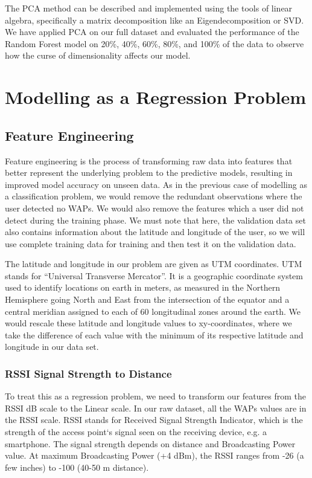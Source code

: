 \documentclass[a4paper,singleside,12pt]{report} %
\begin{document}
				The PCA method can be described and implemented using the tools of linear algebra, specifically a matrix decomposition like an Eigendecomposition or SVD. 
				We have applied PCA on our full dataset and evaluated the performance of the Random Forest model on 20\%, 40\%, 60\%, 80\%, and 100\% of the data to observe how the curse of dimensionality affects our model.



\newpage


		\section{Modelling as a Regression Problem}
			\subsection{Feature Engineering}

			Feature engineering is the process of transforming raw data into features that better represent the underlying problem to the predictive models, resulting in improved model accuracy on unseen data. 
			As in the previous case of modelling as a classification problem, we would remove the redundant observations where the user detected no WAPs. 
			We would also remove the features which a user did not detect during the training phase. 
			We must note that here, the validation data set also contains information about the latitude and longitude of the user, so we will use complete training data for training and then test it on the validation data.
			
			The latitude and longitude in our problem are given as UTM coordinates. 
			UTM stands for “Universal Transverse Mercator”. 
			It is a geographic coordinate system used to identify locations on earth in meters, as measured in the Northern Hemisphere going North and East from the intersection of the equator and a central meridian assigned to each of 60 longitudinal zones around the earth. 
			We would rescale these latitude and longitude values to xy-coordinates, where we take the difference of each value with the minimum of its respective latitude and longitude in our data set. 

				\subsubsection{RSSI Signal Strength to Distance}

				To treat this as a regression problem, we need to transform our features from the RSSI dB scale to the Linear scale. 
				In our raw dataset, all the WAPs values are in the RSSI scale. 
				RSSI stands for Received Signal Strength Indicator, which is the strength of the access point`s signal seen on the receiving device, e.g. a smartphone. 
				The signal strength depends on distance and Broadcasting Power value. At maximum Broadcasting Power (+4 dBm), the RSSI ranges from -26 (a few inches) to -100 (40-50 m distance).
				
\end{document}

